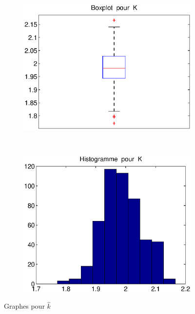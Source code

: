 \begin{figure}[!ht]
        \centering
        \begin{subfigure}[b]{0.4\textwidth}
                \includegraphics[width=\textwidth]{graphes/boxplot_kmg.eps}
        \end{subfigure}%
        ~
        \begin{subfigure}[b]{0.4\textwidth}
                \includegraphics[width=\textwidth]{graphes/hist_kmg.eps}
        \end{subfigure}
        \caption{Graphes pour $\hat{k}$}\label{fig:kmg}
\end{figure}

